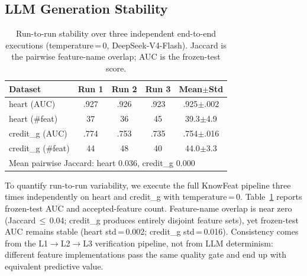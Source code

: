 \subsection{LLM Generation Stability}
\label{subsec:stability}

\begin{table}[t]
\centering
\caption{Run-to-run stability over three independent end-to-end executions (temperature\,=\,0, DeepSeek-V4-Flash). Jaccard is the pairwise feature-name overlap; AUC is the frozen-test score.}
\label{tab:stability}
\small
\renewcommand{\arraystretch}{1.15}
\setlength{\tabcolsep}{4pt}
\begin{tabular}{l c c c c}
\hline
\textbf{Dataset} & \textbf{Run 1} & \textbf{Run 2} & \textbf{Run 3} & \textbf{Mean$\pm$Std} \\
\hline
heart (AUC)      & .927 & .926 & .923 & .925$\pm$.002 \\
heart (\#feat)   & 37   & 36   & 45   & 39.3$\pm$4.9 \\
credit\_g (AUC)  & .774 & .753 & .735 & .754$\pm$.016 \\
credit\_g (\#feat) & 44 & 48   & 40   & 44.0$\pm$3.3 \\
\hline
\multicolumn{5}{l}{\scriptsize Mean pairwise Jaccard: heart 0.036, credit\_g 0.000} \\
\end{tabular}
\end{table}

To quantify run-to-run variability, we execute the full KnowFeat pipeline three times independently on heart and credit\_g with temperature\,=\,0. Table~\ref{tab:stability} reports frozen-test AUC and accepted-feature count. Feature-name overlap is near zero (Jaccard\,$\leq$\,0.04; credit\_g produces entirely disjoint feature sets), yet frozen-test AUC remains stable (heart std\,=\,0.002; credit\_g std\,=\,0.016). Consistency comes from the L1$\rightarrow$L2$\rightarrow$L3 verification pipeline, not from LLM determinism: different feature implementations pass the same quality gate and end up with equivalent predictive value.
